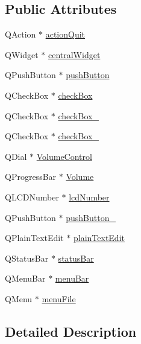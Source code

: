 \subsection*{Public Attributes}
\begin{DoxyCompactItemize}
\item 
Q\-Action $\ast$ \hyperlink{class_ui___main_window_a188c243f36a2dbc10e4e2a0ad94273b1}{action\-Quit}
\item 
Q\-Widget $\ast$ \hyperlink{class_ui___main_window_a30075506c2116c3ed4ff25e07ae75f81}{central\-Widget}
\item 
Q\-Push\-Button $\ast$ \hyperlink{class_ui___main_window_ad332d93084584930878f1daf5f84cdbf}{push\-Button}
\item 
Q\-Check\-Box $\ast$ \hyperlink{class_ui___main_window_ae8154204ed56489a091cf3a81af1f996}{check\-Box}
\item 
Q\-Check\-Box $\ast$ \hyperlink{class_ui___main_window_a42f54d4275ffecc52ea117a43a2a4def}{check\-Box\-\_}
\item 
Q\-Check\-Box $\ast$ \hyperlink{class_ui___main_window_a7a0d575eebed36eac1592982b62ea449}{check\-Box\-\_}
\item 
Q\-Dial $\ast$ \hyperlink{class_ui___main_window_a28c6790b1ca7f5d79927f26c7d7750ef}{Volume\-Control}
\item 
Q\-Progress\-Bar $\ast$ \hyperlink{class_ui___main_window_aebd7f3ec198128c31e8cd5c8ec4bc853}{Volume}
\item 
Q\-L\-C\-D\-Number $\ast$ \hyperlink{class_ui___main_window_aeaa664b636e02543a3047acb6d8918c5}{lcd\-Number}
\item 
Q\-Push\-Button $\ast$ \hyperlink{class_ui___main_window_a59a7d8124bce933d63f53f2153d447b4}{push\-Button\-\_}
\item 
Q\-Plain\-Text\-Edit $\ast$ \hyperlink{class_ui___main_window_a6e290c2eca03b98b6f379c71910c0ed6}{plain\-Text\-Edit}
\item 
Q\-Status\-Bar $\ast$ \hyperlink{class_ui___main_window_a50fa481337604bcc8bf68de18ab16ecd}{status\-Bar}
\item 
Q\-Menu\-Bar $\ast$ \hyperlink{class_ui___main_window_a2be1c24ec9adfca18e1dcc951931457f}{menu\-Bar}
\item 
Q\-Menu $\ast$ \hyperlink{class_ui___main_window_a7ba84cb4cdd6a12dc83bf4e100bd8d80}{menu\-File}
\end{DoxyCompactItemize}


\subsection{Detailed Description}


